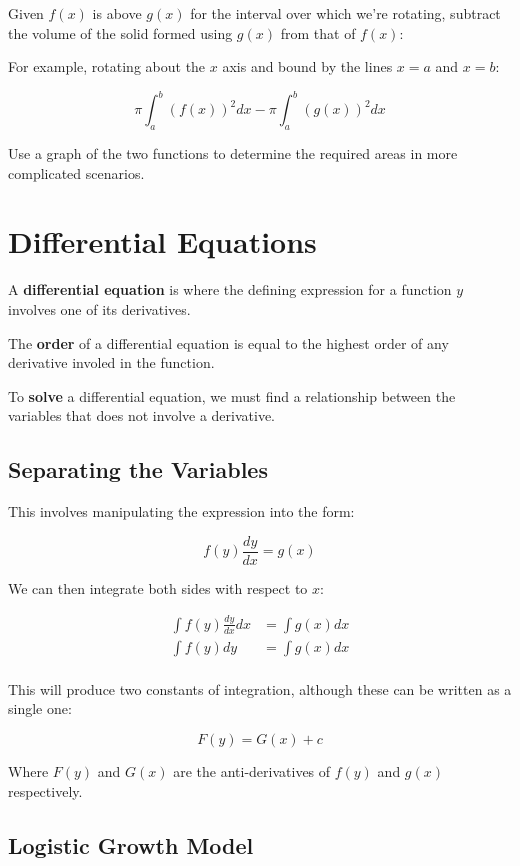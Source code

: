\documentclass[a4paper,11pt]{report}
\begin{document}
Given $f(x)$ is above $g(x)$ for the interval over which we're rotating,
subtract the volume of the solid formed using $g(x)$ from that of $f(x)$:

For example, rotating about the $x$ axis and bound by the lines $x = a$ and
$x = b$:

$$
\pi \int^b_a (f(x))^2 dx - \pi \int^b_a (g(x))^2 dx
$$

Use a graph of the two functions to determine the required areas in more
complicated scenarios.


\section{Differential Equations}

A \textbf{differential equation} is where the defining expression for a function
$y$ involves one of its derivatives.

The \textbf{order} of a differential equation is equal to the highest order of
any derivative involed in the function.

To \textbf{solve} a differential equation, we must find a relationship between the
variables that does not involve a derivative.

\subsection{Separating the Variables}

This involves manipulating the expression into the form:

$$
f(y) \frac{dy}{dx} = g(x)
$$

We can then integrate both sides with respect to $x$:

$$
\begin{aligned}
\int f(y) \frac{dy}{dx} dx & = \int g(x) dx \\
\int f(y) dy & = \int g(x) dx \\
\end{aligned}
$$

This will produce two constants of integration, although these can be written
as a single one:

$$
F(y) = G(x) + c
$$

Where $F(y)$ and $G(x)$ are the anti-derivatives of $f(y)$ and $g(x)$
respectively.

\subsection{Logistic Growth Model}
\end{document}
